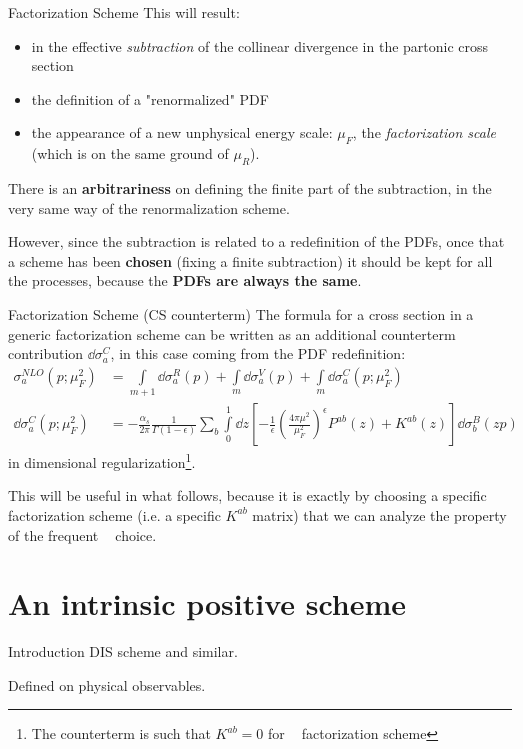 \documentclass[9pt]{beamer}
\DeclareMathOperator{\msbar}{\overline{MS}}
\begin{document}
\begin{frame}{Factorization Scheme}
    This will result:
    \begin{itemize}
        \item in the effective \textit{subtraction} of the collinear divergence
            in the partonic cross section
        \item the definition of a "renormalized" PDF
        \item the appearance of a new unphysical energy scale: $\mu_F$, the
            \textit{factorization scale} (which is on the same ground of $\mu_R$).
    \end{itemize}

    There is an \textbf{arbitrariness} on defining the finite part of the
    subtraction, in the very same way of the renormalization scheme. 

    However, since the subtraction is related to a redefinition of the PDFs,
    once that a scheme has been \textbf{chosen} (fixing a finite subtraction)
    it should be kept for all the processes, because the \textbf{PDFs are
    always the same}.
\end{frame}

\begin{frame}{Factorization Scheme (CS counterterm)}
    The formula for a cross section in a generic factorization scheme can be
    written as an additional counterterm contribution $\dd\sigma^C_a$, in this
    case coming from the PDF redefinition:
    \begin{align*}
        \sigma_a^{NLO}(p; \mu_F^2) &= \int\limits_{m+1} \dd\sigma^R_a(p) +
        \int\limits_{m} \dd\sigma^V_a(p) + \int\limits_{m} \dd\sigma^C_a(p;
        \mu_F^2)\\
        \dd\sigma^C_a(p;\mu_F^2) &= - \frac{\alpha_s}{2\pi}
        \frac{1}{\Gamma(1-\epsilon)} \sum_b \int\limits_0^1 \dd z \left[ -
        \frac{1}{\epsilon} \left(\frac{4\pi\mu^2}{\mu_F^2}\right)^\epsilon
        P^{ab}(z) + K^{ab}(z) \right] \dd \sigma_b^B(zp) 
    \end{align*}
    in dimensional regularization\footnote{The counterterm is such that
    $K^{ab}=0$ for $\msbar$ factorization scheme}.

    This will be useful in what follows, because it is exactly by choosing a
    specific factorization scheme (i.e. a specific $K^{ab}$ matrix) that we can
    analyze the property of the frequent $\msbar$ choice.
\end{frame}

\section{An intrinsic positive scheme}
\begin{frame}{Introduction}
    DIS scheme and similar.

    Defined on physical observables.
\end{frame}
\end{document}
